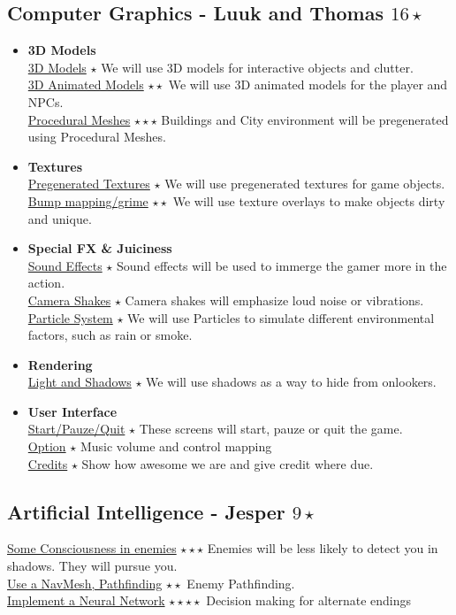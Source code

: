\documentclass{article}
\begin{document}
		\subsection{Computer Graphics - Luuk and Thomas $16 \star$}
			\begin{itemize}
				\item \textbf{3D Models}\\
					\underline{3D Models} $\star$ We will use 3D models for interactive objects and clutter.\\
					\underline{3D Animated Models} $\star \star$  We will use 3D animated models for the player and NPCs.\\
					\underline{Procedural Meshes} $\star \star \star$  Buildings and City environment will be pregenerated using Procedural Meshes.
				\item \textbf{Textures}\\
					\underline{Pregenerated Textures} $\star$ We will use pregenerated textures for game objects.\\
					\underline{Bump mapping/grime} $\star \star$ We will use texture overlays to make objects dirty and unique.
				\item \textbf{Special FX \& Juiciness}\\
					\underline{Sound Effects} $\star$ Sound effects will be used to immerge the gamer more in the action.\\
					\underline{Camera Shakes} $\star$ Camera shakes will emphasize loud noise or vibrations.\\
					\underline{Particle System} $\star$ We will use Particles to simulate different environmental factors, such as rain or smoke.
				\item \textbf{Rendering}\\
					\underline{Light and Shadows} $\star$  We will use shadows as a way to hide from onlookers.
				\item \textbf{User Interface}\\
					\underline{Start/Pauze/Quit} $\star$ These screens will start, pauze or quit the game.\\
					\underline{Option} $\star$ Music volume and control mapping\\
					\underline{Credits} $\star$ Show how awesome we are and give credit where due.
			\end{itemize}
		\subsection{Artificial Intelligence - Jesper $9 \star$}
			\underline{Some Consciousness in enemies} $\star \star \star$ Enemies will be less likely to detect you in shadows. They will pursue you.\\
			\underline{Use a NavMesh, Pathfinding} $\star \star$ Enemy Pathfinding.\\
			\underline{Implement a Neural Network} $\star \star \star \star$ Decision making for alternate endings
\end{document}
